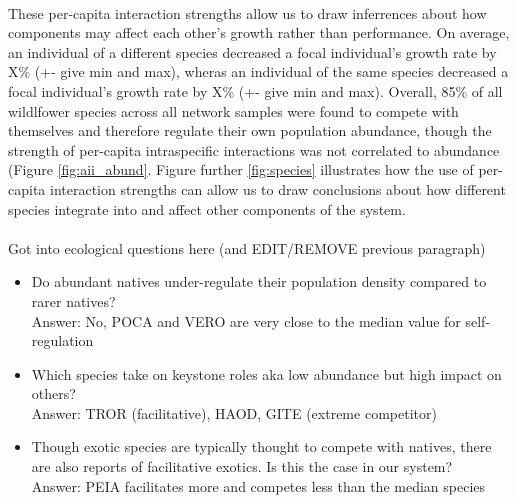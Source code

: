 \documentclass[a4,12pt]{article}
\begin{document}
\begin{itemize}
    \paragraph{}
    These per-capita interaction strengths allow us to draw inferrences about how components may affect each other's growth rather than performance. On average, an individual of a different species decreased a focal individual's growth rate by X\% (+- give min and max), wheras an individual of the same species decreased a focal individual's growth rate by X\% (+- give min and max). Overall, 85\% of all wildlfower species across all network samples were found to compete with themselves and therefore regulate their own population abundance, though the strength of per-capita intraspecific interactions was not correlated to abundance (Figure \ref{fig:aii_abund}. Figure further \ref{fig:species} illustrates how the use of per-capita interaction strengths can allow us to draw conclusions about how different species integrate into and affect other components of the system.  

    \paragraph{}
    Got into ecological questions here (and EDIT/REMOVE previous paragraph)
        \begin{itemize}
            \item Do abundant natives under-regulate their population density compared to rarer natives? \\
            Answer: No, POCA and VERO are very close to the median value for self-regulation
            \item Which species take on keystone roles aka low abundance but high impact on others? \\
            Answer: TROR (facilitative), HAOD, GITE (extreme competitor)
            \item Though exotic species are typically thought to compete with natives, there are also reports of facilitative exotics. Is this the case in our system? \\
            Answer: PEIA facilitates more and competes less than the median species 
        \end{itemize}








\end{itemize}
\end{document}
